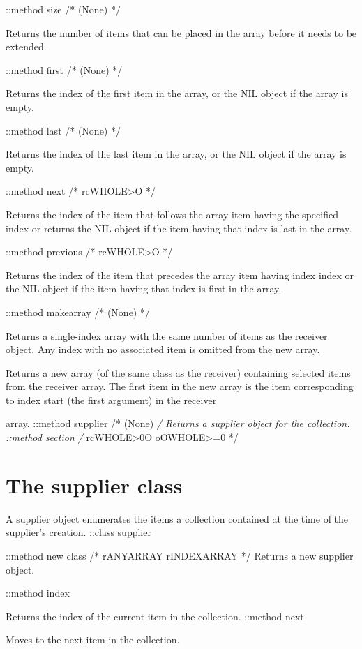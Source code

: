 ::method size /* (None) */

Returns the number of items that can be placed in the array before it
needs to be extended.

::method first /* (None) */

Returns the index of the first item in the array, or the NIL object if
the array is empty.

::method last /* (None) */

Returns the index of the last item in the array, or the NIL object if
the array is empty.

::method next /* rcWHOLE\textgreater O */

Returns the index of the item that follows the array item having the
specified index or returns the NIL object if the item having that index
is last in the array.

::method previous /* rcWHOLE\textgreater O */

Returns the index of the item that precedes the array item having index
index or the NIL object if the item having that index is first in the
array.

::method makearray /* (None) */

Returns a single-index array with the same number of items as the
receiver object. Any index with no associated item is omitted from the
new array.

Returns a new array (of the same class as the receiver) containing
selected items from the receiver array. The first item in the new array
is the item corresponding to index start (the first argument) in the
receiver

array. ::method supplier /* (None) \emph{/ Returns a supplier object for
the collection. ::method section /} rcWHOLE\textgreater0O
oOWHOLE\textgreater=0 */

\section{The supplier class}\label{the-supplier-class}

A supplier object enumerates the items a collection contained at the
time of the supplier's creation. ::class supplier

::method new class /* rANYARRAY rINDEXARRAY */ Returns a new supplier
object.

::method index

Returns the index of the current item in the collection. ::method next

Moves to the next item in the collection.


